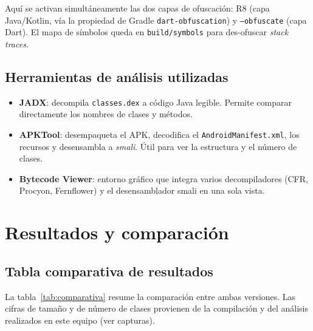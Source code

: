 \documentclass[12pt,letterpaper]{article}
\begin{document}
Aquí se activan simultáneamente las dos capas de ofuscación: R8 (capa
Java/Kotlin, vía la propiedad de Gradle \texttt{dart-obfuscation}) y
\texttt{--obfuscate} (capa Dart). El mapa de símbolos queda en
\texttt{build/symbols} para des-ofuscar \emph{stack traces}.

\subsection{Herramientas de análisis utilizadas}

\begin{itemize}[leftmargin=1.4em]
  \item \textbf{JADX}: decompila \texttt{classes.dex} a código Java legible.
        Permite comparar directamente los nombres de clases y métodos.
  \item \textbf{APKTool}: desempaqueta el APK, decodifica el
        \texttt{AndroidManifest.xml}, los recursos y desensambla a
        \emph{smali}. Útil para ver la estructura y el número de clases.
  \item \textbf{Bytecode Viewer}: entorno gráfico que integra varios
        decompiladores (CFR, Procyon, Fernflower) y el desensamblador smali en
        una sola vista.
\end{itemize}

\section{Resultados y comparación}

\subsection{Tabla comparativa de resultados}

La tabla~\ref{tab:comparativa} resume la comparación entre ambas versiones.
Las cifras de tamaño y de número de clases provienen de la compilación y del
análisis realizados en este equipo (ver capturas).
\end{document}
